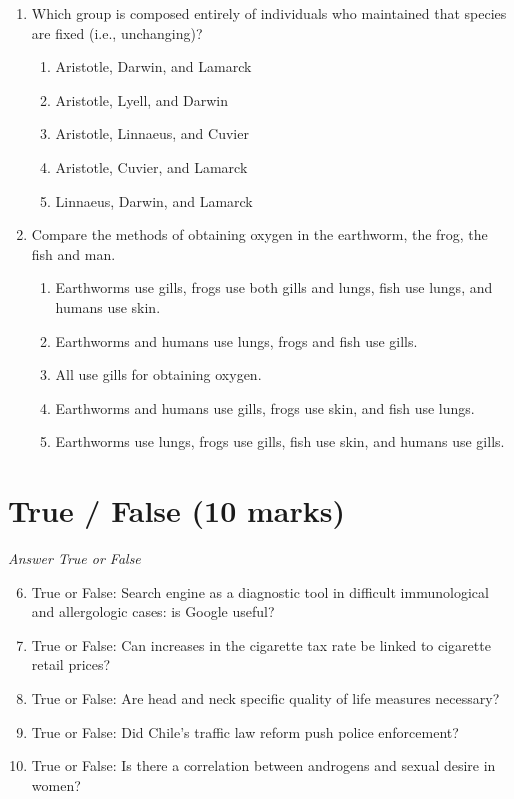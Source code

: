 \documentclass[12pt]{article}
\begin{document}
\begin{enumerate}[label=\arabic*.]
\begin{enumerate}[label=(\alph*)]
    \item It is not affected by the environmental changes.
\end{enumerate}
\item Which group is composed entirely of individuals who maintained that species are fixed (i.e., unchanging)?
\begin{enumerate}[label=(\alph*)]
    \item Aristotle, Darwin, and Lamarck
    \item Aristotle, Lyell, and Darwin
    \item Aristotle, Linnaeus, and Cuvier
    \item Aristotle, Cuvier, and Lamarck
    \item Linnaeus, Darwin, and Lamarck
\end{enumerate}
\item Compare the methods of obtaining oxygen in the earthworm, the frog, the fish and man.
\begin{enumerate}[label=(\alph*)]
    \item Earthworms use gills, frogs use both gills and lungs, fish use lungs, and humans use skin.
    \item Earthworms and humans use lungs, frogs and fish use gills.
    \item All use gills for obtaining oxygen.
    \item Earthworms and humans use gills, frogs use skin, and fish use lungs.
    \item Earthworms use lungs, frogs use gills, fish use skin, and humans use gills.
\end{enumerate}
\end{enumerate}

\section*{True / False (10 marks)}
\textit{Answer True or False}
\begin{enumerate}[label=\arabic*.]
\setcounter{enumi}{5}
\item True or False: Search engine as a diagnostic tool in difficult immunological and allergologic cases: is Google useful?
\item True or False: Can increases in the cigarette tax rate be linked to cigarette retail prices?
\item True or False: Are head and neck specific quality of life measures necessary?
\item True or False: Did Chile's traffic law reform push police enforcement?
\item True or False: Is there a correlation between androgens and sexual desire in women?
\end{enumerate}
\end{document}
